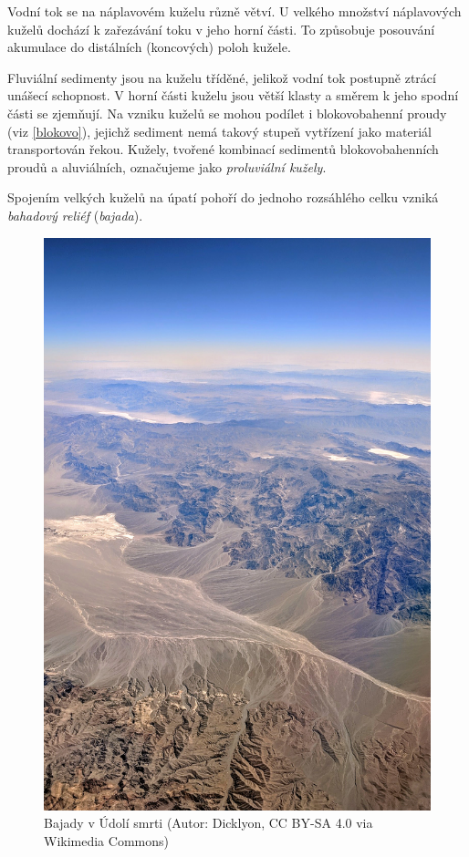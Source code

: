Vodní tok se na náplavovém kuželu různě větví. U velkého množství náplavových kuželů dochází k zařezávání toku v jeho horní části. To způsobuje posouvání akumulace do distálních (koncových) poloh kužele. 

Fluviální sedimenty jsou na kuželu tříděné, jelikož vodní tok postupně ztrácí unášecí schopnost. V horní části kuželu jsou větší klasty a směrem k jeho spodní části se zjemňují. Na vzniku kuželů se mohou podílet i blokovobahenní proudy (viz \ref{blokovo}), jejichž sediment nemá takový stupeň vytřízení jako materiál transportován řekou. Kužely, tvořené kombinací sedimentů blokovobahenních proudů a aluviálních, označujeme jako \emph{proluviální kužely}.

Spojením velkých kuželů na úpatí pohoří do jednoho rozsáhlého celku vzniká \emph{bahadový reliéf} (\textit{bajada}). 

\begin{figure}[h]
	\centering
	\includegraphics[width=1\linewidth]{obrazky/fluvial/bajada}
	\caption{Bajady v Údolí smrti (Autor: Dicklyon, CC BY-SA 4.0 via Wikimedia Commons)}
	\label{fig:bajada}
\end{figure}

%		
%
%	

